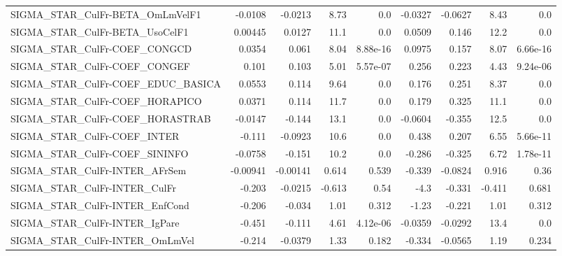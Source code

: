 \begin{tabular}{lrrrrrrrr}
SIGMA\_STAR\_CulFr-BETA\_OmLmVelF1       &     -0.0108 &      -0.0213 &     8.73 &      0.0 &    -0.0327 &     -0.0627 &         8.43 &           0.0 \\
SIGMA\_STAR\_CulFr-BETA\_UsoCelF1        &     0.00445 &       0.0127 &     11.1 &      0.0 &     0.0509 &       0.146 &         12.2 &           0.0 \\
SIGMA\_STAR\_CulFr-COEF\_CONGCD          &      0.0354 &        0.061 &     8.04 & 8.88e-16 &     0.0975 &       0.157 &         8.07 &      6.66e-16 \\
SIGMA\_STAR\_CulFr-COEF\_CONGEF          &       0.101 &        0.103 &     5.01 & 5.57e-07 &      0.256 &       0.223 &         4.43 &      9.24e-06 \\
SIGMA\_STAR\_CulFr-COEF\_EDUC\_BASICA     &      0.0553 &        0.114 &     9.64 &      0.0 &      0.176 &       0.251 &         8.37 &           0.0 \\
SIGMA\_STAR\_CulFr-COEF\_HORAPICO        &      0.0371 &        0.114 &     11.7 &      0.0 &      0.179 &       0.325 &         11.1 &           0.0 \\
SIGMA\_STAR\_CulFr-COEF\_HORASTRAB       &     -0.0147 &       -0.144 &     13.1 &      0.0 &    -0.0604 &      -0.355 &         12.5 &           0.0 \\
SIGMA\_STAR\_CulFr-COEF\_INTER           &      -0.111 &      -0.0923 &     10.6 &      0.0 &      0.438 &       0.207 &         6.55 &      5.66e-11 \\
SIGMA\_STAR\_CulFr-COEF\_SININFO         &     -0.0758 &       -0.151 &     10.2 &      0.0 &     -0.286 &      -0.325 &         6.72 &      1.78e-11 \\
SIGMA\_STAR\_CulFr-INTER\_AFrSem         &    -0.00941 &     -0.00141 &    0.614 &    0.539 &     -0.339 &     -0.0824 &        0.916 &          0.36 \\
SIGMA\_STAR\_CulFr-INTER\_CulFr          &      -0.203 &      -0.0215 &   -0.613 &     0.54 &       -4.3 &      -0.331 &       -0.411 &         0.681 \\
SIGMA\_STAR\_CulFr-INTER\_EnfCond        &      -0.206 &       -0.034 &     1.01 &    0.312 &      -1.23 &      -0.221 &         1.01 &         0.312 \\
SIGMA\_STAR\_CulFr-INTER\_IgPare         &      -0.451 &       -0.111 &     4.61 & 4.12e-06 &    -0.0359 &     -0.0292 &         13.4 &           0.0 \\
SIGMA\_STAR\_CulFr-INTER\_OmLmVel        &      -0.214 &      -0.0379 &     1.33 &    0.182 &     -0.334 &     -0.0565 &         1.19 &         0.234 \\

\end{tabular}
